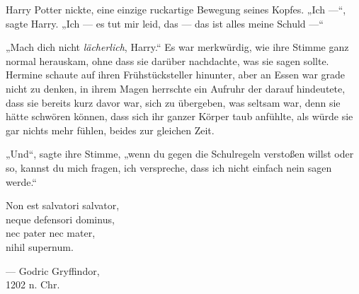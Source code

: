 Harry Potter nickte, eine einzige ruckartige Bewegung seines Kopfes.
„Ich —“, sagte Harry.
„Ich — es tut mir leid, das — das ist alles meine Schuld —“

„Mach dich nicht \emph{lächerlich}, Harry.“ Es war merkwürdig, wie ihre Stimme ganz normal herauskam, ohne dass sie darüber nachdachte, was sie sagen sollte. Hermine schaute auf ihren Frühstücksteller hinunter, aber an Essen war grade nicht zu denken, in ihrem Magen herrschte ein Aufruhr der darauf hindeutete, dass sie bereits kurz davor war, sich zu übergeben, was seltsam war, denn sie hätte schwören können, dass sich ihr ganzer Körper taub anfühlte, als würde sie gar nichts mehr fühlen, beides zur gleichen Zeit.

„Und“, sagte ihre Stimme, „wenn du gegen die Schulregeln verstoßen willst oder so, kannst du mich fragen, ich verspreche, dass ich nicht einfach nein sagen werde.“

\later

\begin{center}
Non est salvatori salvator,\\
neque defensori dominus,\\
nec pater nec mater,\\
nihil supernum.

— Godric Gryffindor,\\
1202 n. Chr.
\end{center}

